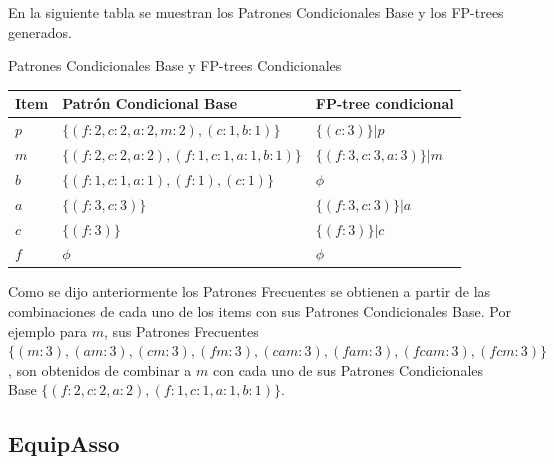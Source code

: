 En la siguiente tabla se muestran los Patrones Condicionales Base y los FP-trees generados.

\begin{table}[h]
\caption{Patrones Condicionales Base y FP-trees Condicionales}
\end{table}
\begin{center}
\begin{tabular}{|p{10mm}|p{76mm}|p{42mm}|}\hline
\textbf{Item} & \textbf{Patr\'on Condicional Base} & \textbf{FP-tree condicional}\\ \hline
$p$ & $\{(f:2,c:2,a:2,m:2),(c:1,b:1)\}$			& $\{(c:3)\}|p$\\ \hline
$m$ & $\{(f:2,c:2,a:2),(f:1,c:1,a:1,b:1)\}$		& $\{(f:3,c:3,a:3)\}|m$\\ \hline
$b$ & $\{(f:1,c:1,a:1),(f:1),(c:1)\}$			& $\phi$\\ \hline
$a$ & $\{(f:3,c:3)\}$					& $\{(f:3,c:3)\}|a$\\ \hline
$c$ & $\{(f:3)\}$					& $\{(f:3)\}|c$\\ \hline
$f$ & $\phi$						& $\phi$\\ \hline
\end{tabular}
\end{center}

Como se dijo anteriormente los Patrones Frecuentes se obtienen a partir de las combinaciones de cada uno de los
items con sus Patrones Condicionales Base. Por ejemplo para $m$, sus Patrones Frecuentes 
$\{(m:3),(am:3),(cm:3),(fm:3),(cam:3),(fam:3),(fcam:3),(fcm:3)\}$, son obtenidos de combinar a $m$ con cada uno
de sus Patrones Condicionales Base $\{(f:2,c:2,a:2),(f:1,c:1,a:1,b:1)\}$.

\subsection{EquipAsso}

